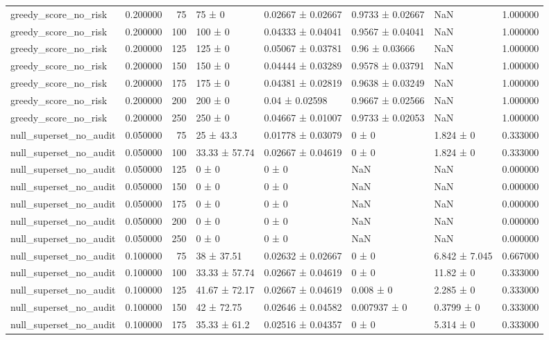 \begin{tabular}{lrrllllr}
greedy_score_no_risk & 0.200000 & 75 & 75 ± 0 & 0.02667 ± 0.02667 & 0.9733 ± 0.02667 & NaN & 1.000000 \\
greedy_score_no_risk & 0.200000 & 100 & 100 ± 0 & 0.04333 ± 0.04041 & 0.9567 ± 0.04041 & NaN & 1.000000 \\
greedy_score_no_risk & 0.200000 & 125 & 125 ± 0 & 0.05067 ± 0.03781 & 0.96 ± 0.03666 & NaN & 1.000000 \\
greedy_score_no_risk & 0.200000 & 150 & 150 ± 0 & 0.04444 ± 0.03289 & 0.9578 ± 0.03791 & NaN & 1.000000 \\
greedy_score_no_risk & 0.200000 & 175 & 175 ± 0 & 0.04381 ± 0.02819 & 0.9638 ± 0.03249 & NaN & 1.000000 \\
greedy_score_no_risk & 0.200000 & 200 & 200 ± 0 & 0.04 ± 0.02598 & 0.9667 ± 0.02566 & NaN & 1.000000 \\
greedy_score_no_risk & 0.200000 & 250 & 250 ± 0 & 0.04667 ± 0.01007 & 0.9733 ± 0.02053 & NaN & 1.000000 \\
null_superset_no_audit & 0.050000 & 75 & 25 ± 43.3 & 0.01778 ± 0.03079 & 0 ± 0 & 1.824 ± 0 & 0.333000 \\
null_superset_no_audit & 0.050000 & 100 & 33.33 ± 57.74 & 0.02667 ± 0.04619 & 0 ± 0 & 1.824 ± 0 & 0.333000 \\
null_superset_no_audit & 0.050000 & 125 & 0 ± 0 & 0 ± 0 & NaN & NaN & 0.000000 \\
null_superset_no_audit & 0.050000 & 150 & 0 ± 0 & 0 ± 0 & NaN & NaN & 0.000000 \\
null_superset_no_audit & 0.050000 & 175 & 0 ± 0 & 0 ± 0 & NaN & NaN & 0.000000 \\
null_superset_no_audit & 0.050000 & 200 & 0 ± 0 & 0 ± 0 & NaN & NaN & 0.000000 \\
null_superset_no_audit & 0.050000 & 250 & 0 ± 0 & 0 ± 0 & NaN & NaN & 0.000000 \\
null_superset_no_audit & 0.100000 & 75 & 38 ± 37.51 & 0.02632 ± 0.02667 & 0 ± 0 & 6.842 ± 7.045 & 0.667000 \\
null_superset_no_audit & 0.100000 & 100 & 33.33 ± 57.74 & 0.02667 ± 0.04619 & 0 ± 0 & 11.82 ± 0 & 0.333000 \\
null_superset_no_audit & 0.100000 & 125 & 41.67 ± 72.17 & 0.02667 ± 0.04619 & 0.008 ± 0 & 2.285 ± 0 & 0.333000 \\
null_superset_no_audit & 0.100000 & 150 & 42 ± 72.75 & 0.02646 ± 0.04582 & 0.007937 ± 0 & 0.3799 ± 0 & 0.333000 \\
null_superset_no_audit & 0.100000 & 175 & 35.33 ± 61.2 & 0.02516 ± 0.04357 & 0 ± 0 & 5.314 ± 0 & 0.333000 \\

\end{tabular}
